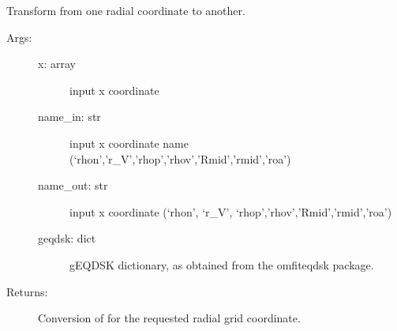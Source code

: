 \documentclass[letterpaper,10pt,english]{sphinxmanual}
\begin{document}

\begin{fulllineitems}
\label{\detokenize{aurora:aurora.coords.rad_coord_transform}}
Transform from one radial coordinate to another.
\begin{description}
\item[{Args:}] \leavevmode\begin{description}
\item[{x: array}] \leavevmode
input x coordinate

\item[{name\_in: str}] \leavevmode
input x coordinate name (‘rhon’,’r\_V’,’rhop’,’rhov’,’Rmid’,’rmid’,’roa’)

\item[{name\_out: str}] \leavevmode
input x coordinate (‘rhon’, ‘r\_V’, ‘rhop’,’rhov’,’Rmid’,’rmid’,’roa’)

\item[{geqdsk: dict}] \leavevmode
gEQDSK dictionary, as obtained from the omfit\sphinxhyphen{}eqdsk package.

\end{description}

\item[{Returns:}] \leavevmode
Conversion of  for the requested radial grid coordinate.

\end{description}

\end{fulllineitems}

\end{document}
